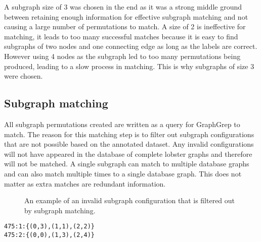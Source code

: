 \noindent
A subgraph size of 3 was chosen in the end as it was a strong middle ground between retaining enough information for effective subgraph matching and not causing a large number of permutations to match. A size of 2 is ineffective for matching, it leads to too many successful matches because it is easy to find subgraphs of two nodes and one connecting edge as long as the labels are correct. However using 4 nodes as the subgraph led to too many permutations being produced, leading to a slow process in matching. This is why subgraphs of size 3 were chosen.



\subsection{Subgraph matching}
All subgraph permutations created are written as a query for GraphGrep to match. The reason for this matching step is to filter out subgraph configurations that are not  possible based on the annotated dataset. Any invalid configurations will not have appeared in the database of complete lobster graphs and therefore will not be matched. A single subgraph can match to multiple database graphs and can also match multiple times to a single database graph. This does not matter as extra matches are redundant information. 
\begin{figure}[H]
\centering
{}
\caption{An example of an invalid subgraph configuration that is filtered out by subgraph matching.}
\end{figure}

\begin{lstlisting}[caption={Example of matching output from GraphGrep}]
475:1:{(0,3),(1,1),(2,2)}
475:2:{(0,0),(1,3),(2,4)}
\end{lstlisting}

